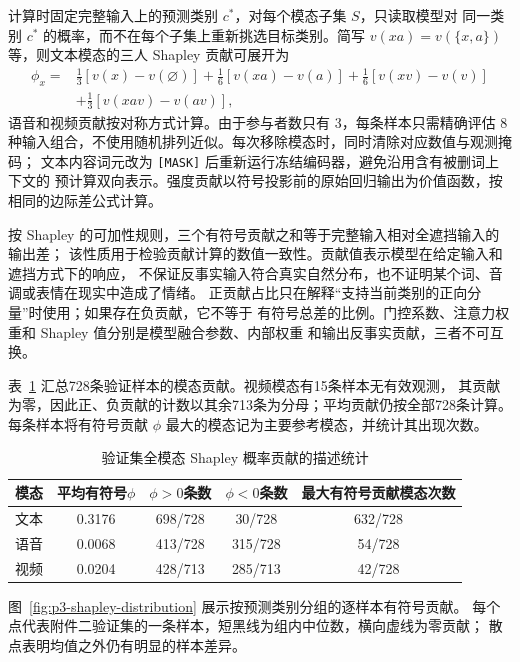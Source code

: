 \documentclass[bwprint]{gmcmthesis}
\begin{document}
计算时固定完整输入上的预测类别 $c^\ast$，对每个模态子集 $S$，只读取模型对
同一类别 $c^\ast$ 的概率，而不在每个子集上重新挑选目标类别。简写
$v(xa)=v(\{x,a\})$ 等，则文本模态的三人 Shapley 贡献可展开为
\begin{equation}
\begin{aligned}
 \phi_x={}&\frac13[v(x)-v(\varnothing)]
 +\frac16[v(xa)-v(a)] +\frac16[v(xv)-v(v)]\\
 &+\frac13[v(xav)-v(av)],
\end{aligned}
\label{eq:p3-shapley-expanded}
\end{equation}
语音和视频贡献按对称方式计算。由于参与者数只有 $3$，每条样本只需精确评估
$8$ 种输入组合，不使用随机排列近似。每次移除模态时，同时清除对应数值与观测掩码；
文本内容词元改为 \texttt{[MASK]} 后重新运行冻结编码器，避免沿用含有被删词上下文的
预计算双向表示。强度贡献以符号投影前的原始回归输出为价值函数，按相同的边际差公式计算。

按 Shapley 的可加性规则，三个有符号贡献之和等于完整输入相对全遮挡输入的输出差；
该性质用于检验贡献计算的数值一致性。贡献值表示模型在给定输入和遮挡方式下的响应，
不保证反事实输入符合真实自然分布，也不证明某个词、音调或表情在现实中造成了情绪。
正贡献占比只在解释“支持当前类别的正向分量”时使用；如果存在负贡献，它不等于
有符号总差的比例。门控系数、注意力权重和 Shapley 值分别是模型融合参数、内部权重
和输出反事实贡献，三者不可互换。

表~\ref{tab:p3-global-shapley} 汇总728条验证样本的模态贡献。视频模态有15条样本无有效观测，
其贡献为零，因此正、负贡献的计数以其余713条为分母；平均贡献仍按全部728条计算。
每条样本将有符号贡献 $\phi$ 最大的模态记为主要参考模态，并统计其出现次数。

\begin{table}[htbp]
 \centering
 \caption{验证集全模态 Shapley 概率贡献的描述统计}
 \label{tab:p3-global-shapley}
 \begin{tabular*}{\linewidth}{@{\extracolsep{\fill}}ccccc@{}}
 \toprule
 模态 & 平均有符号$\phi$ & $\phi>0$条数 & $\phi<0$条数 & 最大有符号贡献模态次数 \\
 \midrule
 文本 & 0.3176 & 698/728 & 30/728 & 632/728 \\
 语音 & 0.0068 & 413/728 & 315/728 & 54/728 \\
 视频 & 0.0204 & 428/713 & 285/713 & 42/728 \\
 \bottomrule
 \end{tabular*}
\end{table}


图~\ref{fig:p3-shapley-distribution} 展示按预测类别分组的逐样本有符号贡献。
每个点代表附件二验证集的一条样本，短黑线为组内中位数，横向虚线为零贡献；
散点表明均值之外仍有明显的样本差异。
\end{document}
